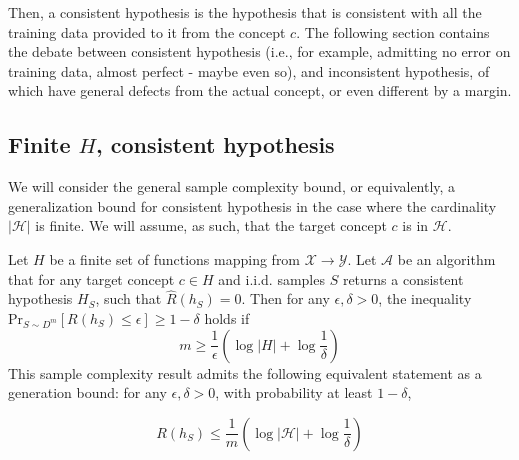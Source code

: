 Then, a consistent hypothesis is the hypothesis that is consistent with all the training data provided to it from the concept $c$. The following section contains the debate between consistent hypothesis (i.e., for example, admitting no error on training data, almost perfect - maybe even so), and inconsistent hypothesis, of which have general defects from the actual concept, or even different by a margin.  


\subsection{Finite $H$, consistent hypothesis}

We will consider the general sample complexity bound, or equivalently, a generalization bound for consistent hypothesis in the case where the cardinality $|\mathcal{H}|$ is finite. We will assume, as such, that the target concept $c$ is in $\mathcal{H}$. 

\begin{theorem}
    Let $H$ be a finite set of functions mapping from $\mathcal{X}\to \mathcal{Y}$. Let $\mathcal{A}$ be an algorithm that for any target concept $c\in H$ and i.i.d. samples $S$ returns a consistent hypothesis $H_{S}$, such that $\hat{R}(h_{S}) = 0$. Then for any  $\epsilon,\delta>0$, the inequality $\mathrm{Pr}_{S\sim D^{m}}[R(h_{S})\leq \epsilon]\geq 1-\delta$ holds if $$m\geq \frac{1}{\epsilon}\left( \log{\lvert H \rvert }+\log{\frac{1}{\delta}} \right)$$
This sample complexity result admits the following equivalent statement as a generation bound: for any $\epsilon,\delta>0$, with probability at least $1-\delta$, 

\begin{equation}
    R(h_S) \leq \frac{1}{m} \left( \log{|\mathcal{H}|} + \log{\frac{1}{\delta}} \right)
\end{equation}
\end{theorem}


